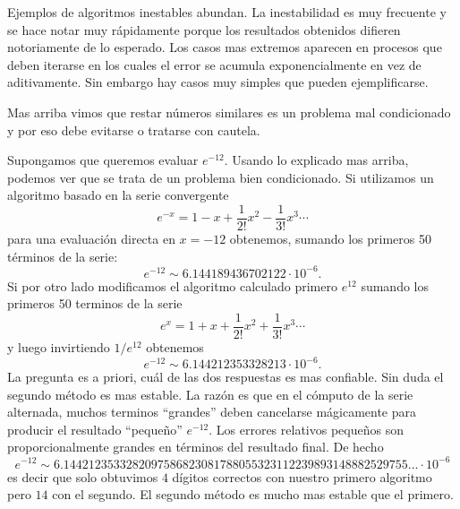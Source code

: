 Ejemplos de algoritmos inestables abundan. La inestabilidad es muy frecuente y se hace notar muy rápidamente porque los resultados obtenidos difieren notoriamente de lo esperado. Los casos mas extremos aparecen en procesos que deben iterarse en los cuales el error se acumula exponencialmente en vez de aditivamente. Sin embargo hay casos muy simples que pueden ejemplificarse.


Mas arriba vimos que restar números similares es un problema mal condicionado y por eso debe evitarse o tratarse con cautela.

Supongamos que queremos evaluar $e^{-12}$. Usando lo explicado mas arriba, podemos ver que se trata de un problema bien condicionado.  Si utilizamos un algoritmo basado en la serie convergente
$$
e^{-x}=1-x+\frac{1}{2!}x^2-\frac{1}{3!}x^3\cdots
$$
para una evaluación directa en $x=-12$ obtenemos, sumando los primeros 50 términos de la serie:
$$
e^{-12}\sim 6.144189436702122\cdot 10^{-6}.$$
Si por otro lado modificamos el algoritmo calculado primero $e^{12}$
sumando los primeros 50 terminos de la serie
$$
e^{x}=1+x+\frac{1}{2!}x^2+\frac{1}{3!}x^3\cdots
$$
y luego invirtiendo $1/e^{12}$ obtenemos
$$e^{-12}\sim 6.144212353328213\cdot 10^{-6}.$$
La pregunta es a priori, cuál de las dos respuestas es mas confiable. Sin duda el segundo método es mas estable. La razón es que en el cómputo de la serie alternada, muchos terminos ``grandes'' deben cancelarse mágicamente para producir el resultado ``pequeño'' $e^{-12}$. Los errores relativos pequeños son proporcionalmente grandes en términos del resultado final. De hecho
$$e^{-12}\sim 6.1442123533282097586823081788055323112239893148882529755...\cdot 10^{-6}$$
es decir que solo obtuvimos $4$ dígitos correctos con nuestro primero algoritmo pero $14$ con el segundo.
El segundo método es mucho mas estable que el primero.


